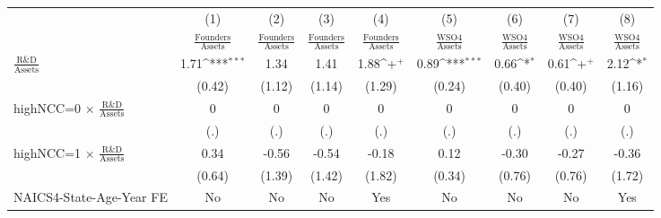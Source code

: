 {
\def\sym#1{\ifmmode^{#1}\else\(^{#1}\)\fi}
\begin{tabular}{l*{8}{c}}
\toprule
                    &\multicolumn{1}{c}{(1)}&\multicolumn{1}{c}{(2)}&\multicolumn{1}{c}{(3)}&\multicolumn{1}{c}{(4)}&\multicolumn{1}{c}{(5)}&\multicolumn{1}{c}{(6)}&\multicolumn{1}{c}{(7)}&\multicolumn{1}{c}{(8)}\\
                    &\multicolumn{1}{c}{$\frac{\textrm{Founders}}{\textrm{Assets}}$}&\multicolumn{1}{c}{$\frac{\textrm{Founders}}{\textrm{Assets}}$}&\multicolumn{1}{c}{$\frac{\textrm{Founders}}{\textrm{Assets}}$}&\multicolumn{1}{c}{$\frac{\textrm{Founders}}{\textrm{Assets}}$}&\multicolumn{1}{c}{$\frac{\textrm{WSO4}}{\textrm{Assets}}$}&\multicolumn{1}{c}{$\frac{\textrm{WSO4}}{\textrm{Assets}}$}&\multicolumn{1}{c}{$\frac{\textrm{WSO4}}{\textrm{Assets}}$}&\multicolumn{1}{c}{$\frac{\textrm{WSO4}}{\textrm{Assets}}$}\\
\midrule
$\frac{\textrm{R\&D}}{\textrm{Assets}}$&        1.71\sym{***}&        1.34         &        1.41         &        1.88\sym{+}  &        0.89\sym{***}&        0.66\sym{*}  &        0.61\sym{+}  &        2.12\sym{*}  \\
                    &      (0.42)         &      (1.12)         &      (1.14)         &      (1.29)         &      (0.24)         &      (0.40)         &      (0.40)         &      (1.16)         \\
\addlinespace
highNCC=0 $\times$ $\frac{\textrm{R\&D}}{\textrm{Assets}}$&           0         &           0         &           0         &           0         &           0         &           0         &           0         &           0         \\
                    &         (.)         &         (.)         &         (.)         &         (.)         &         (.)         &         (.)         &         (.)         &         (.)         \\
\addlinespace
highNCC=1 $\times$ $\frac{\textrm{R\&D}}{\textrm{Assets}}$&        0.34         &       -0.56         &       -0.54         &       -0.18         &        0.12         &       -0.30         &       -0.27         &       -0.36         \\
                    &      (0.64)         &      (1.39)         &      (1.42)         &      (1.82)         &      (0.34)         &      (0.76)         &      (0.76)         &      (1.72)         \\
\addlinespace
NAICS4-State-Age-Year FE&          No         &          No         &          No         &         Yes         &          No         &          No         &          No         &         Yes         \\

\end{tabular}}
